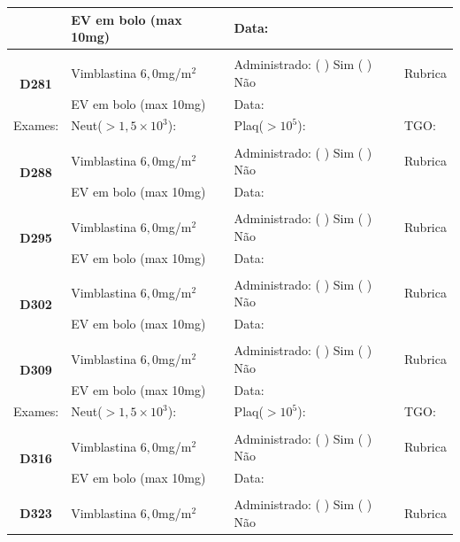\documentclass[11pt,a4paper,oldfontcommands]{memoir}
\begin{document}
\begin{center}
\begin{longtable}{p{1cm}p{5cm}|p{5cm}|p{3cm}}
    \multicolumn{1}{c|}{}&{EV em bolo (max 10mg)}&{Data:}&\\
    \hline
    \\
    \hline
    \multicolumn{1}{c|}{\multirow{2}{*}{\textbf{D281}}}&{Vimblastina \(6,0\)mg/m\(^2\)}&{Administrado: (  ) Sim (  ) Não}&{Rubrica}\\
    \multicolumn{1}{c|}{}&{EV em bolo (max 10mg)}&{Data:}&\\
    \hline
    {\tiny{Exames:}}&{\tiny{Neut(\(>1,5\times10^3\)):}}&{\tiny{Plaq(\(>10^5\)):}}&{\tiny{TGO:}}
    \\
    \hline
    \\
    \hline
    \multicolumn{1}{c|}{\multirow{2}{*}{\textbf{D288}}}&{Vimblastina \(6,0\)mg/m\(^2\)}&{Administrado: (  ) Sim (  ) Não}&{Rubrica}\\
    \multicolumn{1}{c|}{}&{EV em bolo (max 10mg)}&{Data:}&\\
    \hline
    \\
    \hline
    \multicolumn{1}{c|}{\multirow{2}{*}{\textbf{D295}}}&{Vimblastina \(6,0\)mg/m\(^2\)}&{Administrado: (  ) Sim (  ) Não}&{Rubrica}\\
    \multicolumn{1}{c|}{}&{EV em bolo (max 10mg)}&{Data:}&\\
    \hline
    \\
    \hline
    \multicolumn{1}{c|}{\multirow{2}{*}{\textbf{D302}}}&{Vimblastina \(6,0\)mg/m\(^2\)}&{Administrado: (  ) Sim (  ) Não}&{Rubrica}\\
    \multicolumn{1}{c|}{}&{EV em bolo (max 10mg)}&{Data:}&\\
    \hline\\
    \hline
    \multicolumn{1}{c|}{\multirow{2}{*}{\textbf{D309}}}&{Vimblastina \(6,0\)mg/m\(^2\)}&{Administrado: (  ) Sim (  ) Não}&{Rubrica}\\
    \multicolumn{1}{c|}{}&{EV em bolo (max 10mg)}&{Data:}&\\
    \hline
    {\tiny{Exames:}}&{\tiny{Neut(\(>1,5\times10^3\)):}}&{\tiny{Plaq(\(>10^5\)):}}&{\tiny{TGO:}}
    \\
    \hline
    \\
    \hline
    \multicolumn{1}{c|}{\multirow{2}{*}{\textbf{D316}}}&{Vimblastina \(6,0\)mg/m\(^2\)}&{Administrado: (  ) Sim (  ) Não}&{Rubrica}\\
    \multicolumn{1}{c|}{}&{EV em bolo (max 10mg)}&{Data:}&\\
    \hline
    \\
    \hline
    \multicolumn{1}{c|}{\multirow{2}{*}{\textbf{D323}}}&{Vimblastina \(6,0\)mg/m\(^2\)}&{Administrado: (  ) Sim (  ) Não}&{Rubrica}\\

\end{longtable}
\end{center}
\end{document}
